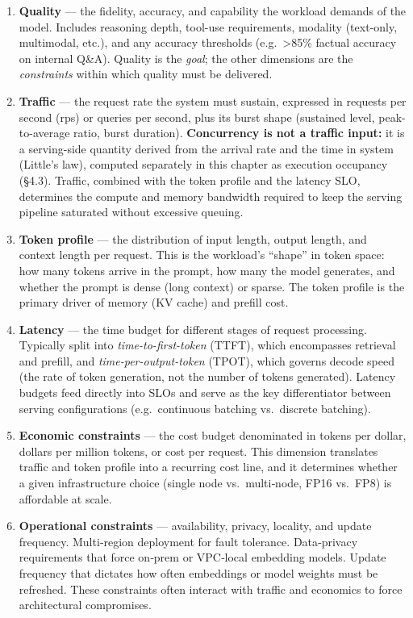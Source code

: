 \begin{enumerate}
\def\labelenumi{\arabic{enumi}.}
\item
  \textbf{Quality} --- the fidelity, accuracy, and capability the
  workload demands of the model. Includes reasoning depth, tool-use
  requirements, modality (text‑only, multimodal, etc.), and any accuracy
  thresholds (e.g.~\textgreater85\% factual accuracy on internal Q\&A).
  Quality is the \emph{goal}; the other dimensions are the
  \emph{constraints} within which quality must be delivered.
\item
  \textbf{Traffic} --- the request rate the system must sustain,
  expressed in requests per second (rps) or queries per second, plus its
  burst shape (sustained level, peak-to-average ratio, burst duration).
  \textbf{Concurrency is not a traffic input:} it is a serving-side
  quantity derived from the arrival rate and the time in system
  (Little's law), computed separately in this chapter as execution
  occupancy (§4.3). Traffic, combined with the token profile and the
  latency SLO, determines the compute and memory bandwidth required to
  keep the serving pipeline saturated without excessive queuing.
\item
  \textbf{Token profile} --- the distribution of input length, output
  length, and context length per request. This is the workload's
  ``shape'' in token space: how many tokens arrive in the prompt, how
  many the model generates, and whether the prompt is dense (long
  context) or sparse. The token profile is the primary driver of memory
  (KV cache) and prefill cost.
\item
  \textbf{Latency} --- the time budget for different stages of request
  processing. Typically split into \emph{time-to-first-token} (TTFT),
  which encompasses retrieval and prefill, and
  \emph{time-per-output-token} (TPOT), which governs decode speed (the
  rate of token generation, not the number of tokens generated). Latency
  budgets feed directly into SLOs and serve as the key differentiator
  between serving configurations (e.g.~continuous batching vs.~discrete
  batching).
\item
  \textbf{Economic constraints} --- the cost budget denominated in
  tokens per dollar, dollars per million tokens, or cost per request.
  This dimension translates traffic and token profile into a recurring
  cost line, and it determines whether a given infrastructure choice
  (single node vs.~multi‑node, FP16 vs.~FP8) is affordable at scale.
\item
  \textbf{Operational constraints} --- availability, privacy, locality,
  and update frequency. Multi‑region deployment for fault tolerance.
  Data‑privacy requirements that force on‑prem or VPC‑local embedding
  models. Update frequency that dictates how often embeddings or model
  weights must be refreshed. These constraints often interact with
  traffic and economics to force architectural compromises.
\end{enumerate}

